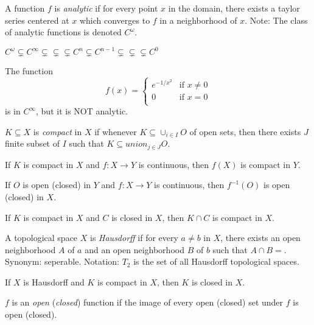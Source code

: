 \documentclass[11pt,leqno,oneside]{amsart}
\begin{document}
\begin{defn}
	A function $f$ is \emph{analytic} if for every point $x$ in the domain, there exists a taylor series centered at $x$ which converges to $f$ in a neighborhood of $x$.  Note: The class of analytic functions is denoted $C^\omega$.
\end{defn}
\begin{thm}
	$C^\omega \subsetneq C^\infty \subsetneq \subsetneq \subsetneq C^n \subsetneq C^{n-1} \subsetneq \subsetneq \subsetneq C^0$
\end{thm}
\begin{example}
	The function $$f(x) =
	\begin{cases}
		e^{-1/x^2} &\text{if $x \neq 0$} \\
		0 &\text{if $x=0$} \\
	\end{cases}
	$$
	is in $C^\infty$, but it is NOT analytic.
\end{example}
\begin{defn}
	$K \subseteq X$ is \emph{compact} in $X$ if whenever $K \subseteq \cup_{i \in I} O$ of open sets, then there exists $J$ finite subset of $I$ such that $K \subseteq union_{j \in J} O$.
\end{defn}
\begin{thm}
	If $K$ is compact in $X$ and $f:X \to Y$ is continuous, then $f(X)$ is compact in $Y$.
\end{thm}
\begin{thm}
	If $O$ is open (closed) in $Y$ and $f:X \to Y$ is continuous, then $f^{-1}(O)$ is open (closed) in $X$.
\end{thm}
\begin{thm}
	If $K$ is compact in $X$ and $C$ is closed in $X$, then $K \cap C$ is compact in $X$.
\end{thm}
\begin{defn}
	A topological space $X$ is \emph{Hausdorff} if for every $a \neq b$ in $X$, there exists an open neighborhood $A$ of $a$ and an open neighborhood $B$ of $b$ such that $A \cap B = {}$.  Synonym: seperable.  Notation: $T_2$ is the set of all Hausdorff topological spaces.
\end{defn}
\begin{lem}
	If $X$ is Hausdorff and $K$ is compact in $X$, then $K$ is closed in $X$.
\end{lem}
\begin{defn}
	$f$ is an \emph{open} (\emph{closed}) function if the image of every open (closed) set under $f$ is open (closed).
\end{defn}
\end{document}
